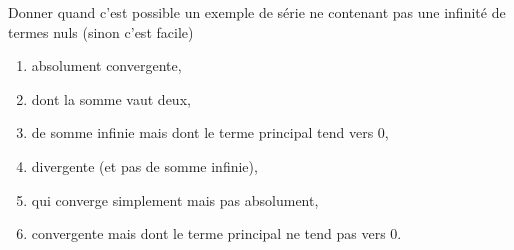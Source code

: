 
\begin{exercice}\label{exo0062}

Donner quand c'est possible un exemple de série ne contenant pas une infinité de termes nuls (sinon c'est facile)
\begin{enumerate}
\item absolument convergente,
\item dont la somme vaut deux,
\item de somme infinie mais dont le terme principal tend vers $0$,
\item divergente (et pas de somme infinie),
\item qui converge simplement mais pas absolument,
\item convergente mais dont le terme principal ne tend pas vers $0$.
\end{enumerate}

\end{exercice}
